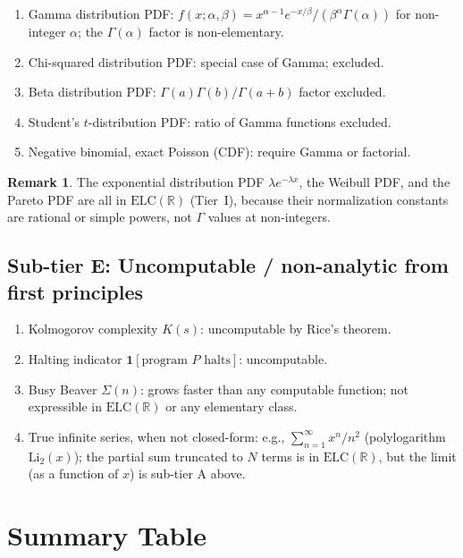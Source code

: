 \documentclass[12pt,a4paper]{article}
\theoremstyle{definition}
\newtheorem{remark}[theorem]{Remark}
\newcommand{\ELC}{\mathrm{ELC}(\mathbb{R})}
\begin{document}
\begin{enumerate}[label=\textbf{D\arabic*.}, leftmargin=*, itemsep=6pt]
\item Gamma distribution PDF:
  $f(x;\alpha,\beta)=x^{\alpha-1}e^{-x/\beta}/(\beta^\alpha\Gamma(\alpha))$
  for non-integer $\alpha$; the $\Gamma(\alpha)$ factor is non-elementary.
\item Chi-squared distribution PDF: special case of Gamma; excluded.
\item Beta distribution PDF: $\Gamma(a)\Gamma(b)/\Gamma(a+b)$ factor excluded.
\item Student's $t$-distribution PDF: ratio of Gamma functions excluded.
\item Negative binomial, exact Poisson (CDF): require Gamma or factorial.
\end{enumerate}

\begin{remark}
The exponential distribution PDF $\lambda e^{-\lambda x}$, the Weibull PDF,
and the Pareto PDF are all in $\ELC$ (Tier~I), because their normalization
constants are rational or simple powers, not $\Gamma$ values at non-integers.
\end{remark}

\subsection{Sub-tier E: Uncomputable / non-analytic from first principles}

\begin{enumerate}[label=\textbf{E\arabic*.}, leftmargin=*, itemsep=6pt]
\item Kolmogorov complexity $K(s)$: uncomputable by Rice's theorem.
\item Halting indicator $\mathbf{1}[\text{program }P\text{ halts}]$: uncomputable.
\item Busy Beaver $\Sigma(n)$: grows faster than any computable function;
  not expressible in $\ELC$ or any elementary class.
\item True infinite series, when not closed-form:
  e.g., $\sum_{n=1}^\infty x^n/n^2$ (polylogarithm $\mathrm{Li}_2(x)$);
  the partial sum truncated to $N$ terms is in $\ELC$, but the limit (as a
  function of $x$) is sub-tier A above.
\end{enumerate}

\section{Summary Table}
\label{sec:table}
\end{document}
